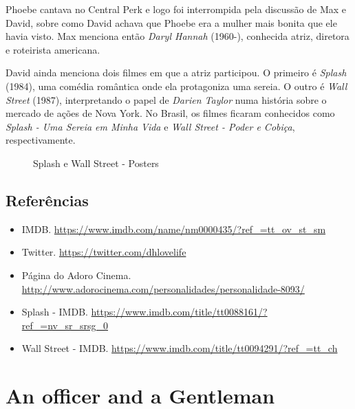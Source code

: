 Phoebe cantava no Central Perk e logo foi interrompida pela discussão de
Max e David, sobre como David achava que Phoebe era a mulher mais bonita
que ele havia visto. Max menciona então \emph{Daryl Hannah} (1960-),
conhecida atriz, diretora e roteirista americana.

David ainda menciona dois filmes em que a atriz participou. O primeiro é
\emph{Splash} (1984), uma comédia romântica onde ela protagoniza uma
sereia. O outro é \emph{Wall Street} (1987), interpretando o papel de
\emph{Darien Taylor} numa história sobre o mercado de ações de Nova
York. No Brasil, os filmes ficaram conhecidos como \emph{Splash - Uma
Sereia em Minha Vida} e \emph{Wall Street - Poder e Cobiça},
respectivamente.

\begin{figure}
  \centering
    \caption{Splash e Wall Street - Posters\label{fig:splash-e-wall-street-posters}}
\end{figure}

\hypertarget{referuxeancias}{%
\subsection{Referências}\label{referuxeancias}}

\begin{itemize}
\tightlist
\item
  \sloppy IMDB. \url{https://www.imdb.com/name/nm0000435/?ref_=tt_ov_st_sm}
\item
  \sloppy Twitter. \url{https://twitter.com/dhlovelife}
\item
  \sloppy Página do Adoro Cinema. \url{http://www.adorocinema.com/personalidades/personalidade-8093/}
\item
  \sloppy Splash - IMDB. \url{https://www.imdb.com/title/tt0088161/?ref_=nv_sr_srsg_0}
\item
  \sloppy Wall Street - IMDB. \url{https://www.imdb.com/title/tt0094291/?ref_=tt_ch}
\end{itemize}

\hypertarget{an-officer-and-a-gentleman}{%
\section{An officer and a Gentleman}\label{an-officer-and-a-gentleman}}

